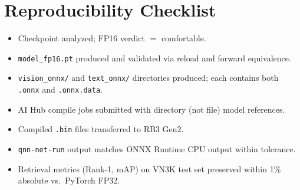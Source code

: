 \documentclass[../main.tex]{subfiles}
\begin{document}
\section{Reproducibility Checklist}

\begin{itemize}[itemsep=0.4em, topsep=0.4em]
    \item[$\square$] Checkpoint analyzed; FP16 verdict $=$ comfortable.
    \item[$\square$] \texttt{model\_fp16.pt} produced and validated via reload and forward equivalence.
    \item[$\square$] \texttt{vision\_onnx/} and \texttt{text\_onnx/} directories produced; each contains both \texttt{.onnx} and \texttt{.onnx.data}.
    \item[$\square$] AI Hub compile jobs submitted with directory (not file) model references.
    \item[$\square$] Compiled \texttt{.bin} files transferred to RB3 Gen2.
    \item[$\square$] \texttt{qnn-net-run} output matches ONNX Runtime CPU output within tolerance.
    \item[$\square$] Retrieval metrics (Rank-1, mAP) on VN3K test set preserved within 1\% absolute vs.\ PyTorch FP32.
\end{itemize}
\end{document}
